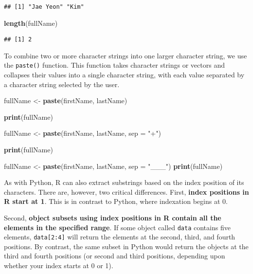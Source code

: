 \documentclass[
]{book}
\newenvironment{Shaded}{\begin{snugshade}}{\end{snugshade}}
\newcommand{\AttributeTok}[1]{\textcolor[rgb]{0.13,0.29,0.53}{#1}}
\newcommand{\FunctionTok}[1]{\textcolor[rgb]{0.13,0.29,0.53}{\textbf{#1}}}
\newcommand{\NormalTok}[1]{#1}
\newcommand{\OtherTok}[1]{\textcolor[rgb]{0.56,0.35,0.01}{#1}}
\newcommand{\StringTok}[1]{\textcolor[rgb]{0.31,0.60,0.02}{#1}}
\begin{document}
\begin{verbatim}
## [1] "Jae Yeon" "Kim"
\end{verbatim}

\begin{Shaded}
\begin{Highlighting}[]
\FunctionTok{length}\NormalTok{(fullName)}
\end{Highlighting}
\end{Shaded}

\begin{verbatim}
## [1] 2
\end{verbatim}

To combine two or more character strings into one larger character string, we use the \texttt{paste()} function. This function takes character strings or vectors and collapses their values into a single character string, with each value separated by a character string selected by the user.

\begin{Shaded}
\begin{Highlighting}[]
\NormalTok{fullName }\OtherTok{\textless{}{-}} \FunctionTok{paste}\NormalTok{(firstName, lastName)}

\FunctionTok{print}\NormalTok{(fullName)}

\NormalTok{fullName }\OtherTok{\textless{}{-}} \FunctionTok{paste}\NormalTok{(firstName, lastName, }\AttributeTok{sep =} \StringTok{"+"}\NormalTok{)}

\FunctionTok{print}\NormalTok{(fullName)}

\NormalTok{fullName }\OtherTok{\textless{}{-}} \FunctionTok{paste}\NormalTok{(firstName, lastName, }\AttributeTok{sep =} \StringTok{"\_\_\_"}\NormalTok{)}
\FunctionTok{print}\NormalTok{(fullName)}
\end{Highlighting}
\end{Shaded}

As with Python, R can also extract substrings based on the index position of its characters. There are, however, two critical differences. First, \textbf{index positions in R start at 1}. This is in contrast to Python, where indexation begins at 0.

Second, \textbf{object subsets using index positions in R contain all the elements in the specified range}. If some object called \texttt{data} contains five elements, \texttt{data{[}2:4{]}} will return the elements at the second, third, and fourth positions. By contrast, the same subset in Python would return the objects at the third and fourth positions (or second and third positions, depending upon whether your index starts at 0 or 1).
\end{document}
